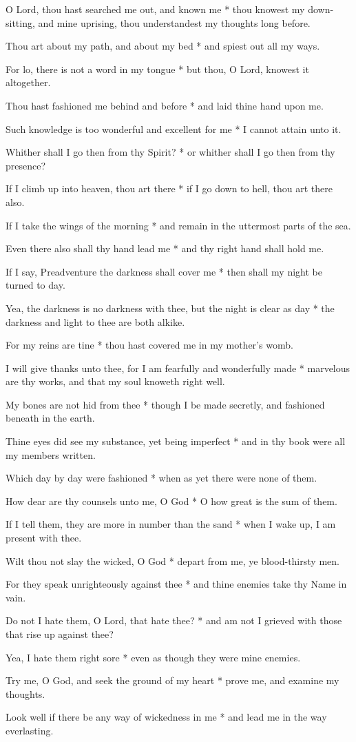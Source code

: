 O Lord, thou hast searched me out, and known me * thou knowest my down-sitting, and mine uprising, thou understandest my thoughts long before.

Thou art about my path, and about my bed * and spiest out all my ways.

For lo, there is not a word in my tongue * but thou, O Lord, knowest it altogether.

Thou hast fashioned me behind and before * and laid thine hand upon me.

Such knowledge is too wonderful and excellent for me * I cannot attain unto it.

Whither shall I go then from thy Spirit? * or whither shall I go then from thy presence?

If I climb up into heaven, thou art there * if I go down to hell, thou art there also.

If I take the wings of the morning * and remain in the uttermost parts of the sea.

Even there also shall thy hand lead me * and thy right hand shall hold me.

If I say, Preadventure the darkness shall cover me * then shall my night be turned to day.

Yea, the darkness is no darkness with thee, but the night is clear as day * the darkness and light to thee are both alkike.

For my reins are tine * thou hast covered me in my mother's womb.

I will give thanks unto thee, for I am fearfully and wonderfully made * marvelous are thy works, and that my soul knoweth right well.

My bones are not hid from thee * though I be made secretly, and fashioned beneath in the earth.

Thine eyes did see my substance, yet being imperfect * and in thy book were all my members written.

Which day by day were fashioned * when as yet there were none of them.

How dear are thy counsels unto me, O God * O how great is the sum of them.

If I tell them, they are more in number than the sand * when I wake up, I am present with thee.

Wilt thou not slay the wicked, O God * depart from me, ye blood-thirsty men.

For they speak unrighteously against thee * and thine enemies take thy Name in vain.

Do not I hate them, O Lord, that hate thee? * and am not I grieved with those that rise up against thee?

Yea, I hate them right sore * even as though they were mine enemies.

Try me, O God, and seek the ground of my heart * prove me, and examine my thoughts.

Look well if there be any way of wickedness in me * and lead me in the way everlasting.